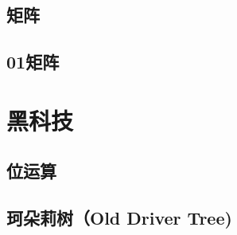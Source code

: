 \section{矩阵}
\raggedbottom
\hrulefill
\section{01矩阵}
\raggedbottom
\hrulefill

\chapter{黑科技}
\section{位运算}
\raggedbottom
\hrulefill
\section{珂朵莉树（Old Driver Tree)}
\raggedbottom
\hrulefill


